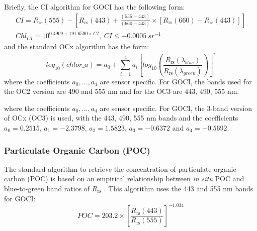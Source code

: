 \documentclass[remotesensing,article,submit,moreauthors,pdftex,10pt,a4paper]{Definitions/mdpi}
\begin{document}
Briefly, the CI algorithm for GOCI has the following form: 
\begin{equation}
\begin{split}
  CI=R_\text{rs}(555)-\left[R_\text{rs}(443)+\frac{(555-443)}{(660-443)}\times [R_\text{rs}(660)-R_\text{rs}(443)]\right]\\
  Chl_{CI} = 10^{0.4909+191.6590\times CI},~CI\leq-0.0005~sr^{-1}
\end{split}  
\end{equation}
\noindent and the standard OCx algorithm has the form: 
\begin{equation}
  log_{10}(chlor\_a) = a_0 + \sum_{i=1}^4 a_i \left[log_{10}\left(\frac{R_\text{rs}(\lambda_{blue})}{R_\text{rs}(\lambda_{green})}\right)\right]^i
\end{equation}
where the coefficients $a_0,...,a_4$ are sensor specific. For GOCI, the bands used for the OC2 version are 490 and 555 nm and for the OC3 are 443, 490, 555 nm.

where the coefficients $a_0,...,a_4$ are sensor specific. For GOCI, the 3-band version of OCx (OC3) is used, with the 443, 490, 555 nm bands and the coefficients $a_0=0.2515$, $a_1=-2.3798$, $a_2=1.5823$, $a_3=-0.6372$ and $a_4=-0.5692$. 
\subsubsection{Particulate Organic Carbon (POC)}
The standard algorithm to retrieve the concentration of particulate organic carbon (POC) is based on an empirical relationship between {\it in situ} POC and blue-to-green band ratios of $R_\text{rs}$ \cite{Stramski2008}. This algorithm uses the 443 and 555 nm bands for GOCI:
\begin{equation}
  POC = 203.2\times \left[\frac{R_\text{rs}(443)}{R_\text{rs}(555)} \right]^{-1.034}
\end{equation}
\end{document}

